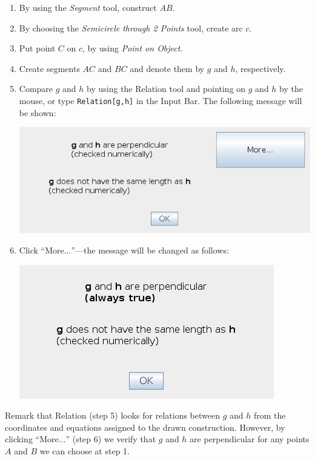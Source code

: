 \documentclass{article}
\begin{document}
\begin{enumerate}
    \item By using the \textit{Segment} tool, construct $AB$.
    \item By choosing the \textit{Semicircle through 2 Points} tool, create arc $c$.
    \item Put point $C$ on $c$, by using \textit{Point on Object}.
    \item Create segments $AC$ and $BC$ and denote them by $g$ and $h$, respectively.
    \item Compare $g$ and $h$ by using the Relation tool and pointing on $g$ and $h$ by the mouse, or type \texttt{Relation[g,h]} in the Input Bar. The following message will be shown:
    \begin{center}
    \includegraphics[scale=0.5]{Relation-example-Relation1}
    \end{center}
    \item Click ``More$\ldots$''---the message will be changed as follows:
    \begin{center}
    \includegraphics[scale=0.5]{Relation-example-Relation2}
    \end{center}
    
\end{enumerate}

Remark that Relation (step 5) looks for relations between $g$ and $h$ from the coordinates and equations assigned to the drawn construction. However, by clicking ``More$\ldots$'' (step 6) we verify that $g$ and $h$ are perpendicular for any points $A$ and $B$ we can choose at step 1.
\end{document}
